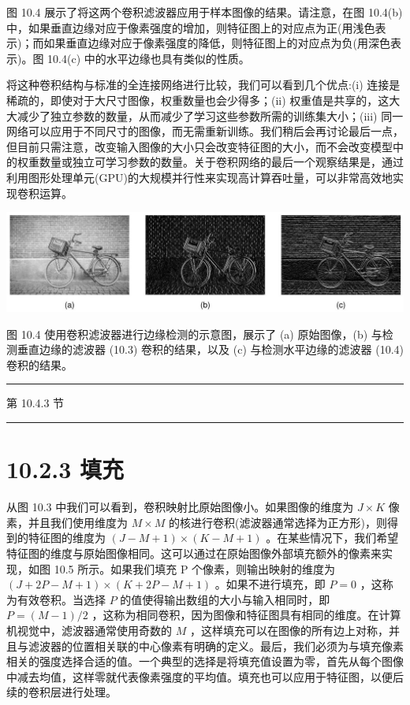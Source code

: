 \documentclass[10pt]{article}
\newcommand{\HRule}{\begin{center}\rule{0.9\linewidth}{0.2mm}\end{center}}
\begin{document}
图 10.4 展示了将这两个卷积滤波器应用于样本图像的结果。请注意，在图 10.4(b) 中，如果垂直边缘对应于像素强度的增加，则特征图上的对应点为正(用浅色表示)；而如果垂直边缘对应于像素强度的降低，则特征图上的对应点为负(用深色表示)。图 10.4(c) 中的水平边缘也具有类似的性质。

将这种卷积结构与标准的全连接网络进行比较，我们可以看到几个优点:(i) 连接是稀疏的，即使对于大尺寸图像，权重数量也会少得多；(ii) 权重值是共享的，这大大减少了独立参数的数量，从而减少了学习这些参数所需的训练集大小；(iii) 同一网络可以应用于不同尺寸的图像，而无需重新训练。我们稍后会再讨论最后一点，但目前只需注意，改变输入图像的大小只会改变特征图的大小，而不会改变模型中的权重数量或独立可学习参数的数量。关于卷积网络的最后一个观察结果是，通过利用图形处理单元(GPU)的大规模并行性来实现高计算吞吐量，可以非常高效地实现卷积运算。

\begin{center}
\includegraphics[max width=1.0\textwidth]{images/0194e279-9b28-703a-88f4-c3ac21e2010d_312_220_1537_1356_342_0.jpg}
\end{center}
\hspace*{3em} 

图 10.4 使用卷积滤波器进行边缘检测的示意图，展示了 (a) 原始图像，(b) 与检测垂直边缘的滤波器 (10.3) 卷积的结果，以及 (c) 与检测水平边缘的滤波器 (10.4) 卷积的结果。

\HRule

第 10.4.3 节

\HRule

\section*{10.2.3 填充}

从图 10.3 中我们可以看到，卷积映射比原始图像小。如果图像的维度为 \(J \times  K\) 像素，并且我们使用维度为 \(M \times  M\) 的核进行卷积(滤波器通常选择为正方形)，则得到的特征图的维度为 \(\left( {J - M + 1}\right)  \times  \left( {K - M + 1}\right)\) 。在某些情况下，我们希望特征图的维度与原始图像相同。这可以通过在原始图像外部填充额外的像素来实现，如图 10.5 所示。如果我们填充 P 个像素，则输出映射的维度为 \(\left( {J + {2P} - M + 1}\right)  \times  \left( {K + {2P} - M + 1}\right)\) 。如果不进行填充，即 \(P = 0\) ，这称为有效卷积。当选择 \(P\) 的值使得输出数组的大小与输入相同时，即 \(P = \left( {M - 1}\right) /2\) ，这称为相同卷积，因为图像和特征图具有相同的维度。在计算机视觉中，滤波器通常使用奇数的 \(M\) ，这样填充可以在图像的所有边上对称，并且与滤波器的位置相关联的中心像素有明确的定义。最后，我们必须为与填充像素相关的强度选择合适的值。一个典型的选择是将填充值设置为零，首先从每个图像中减去均值，这样零就代表像素强度的平均值。填充也可以应用于特征图，以便后续的卷积层进行处理。
\end{document}
